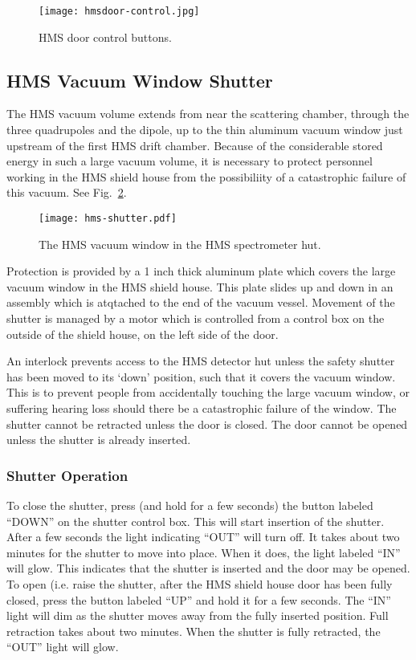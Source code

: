 {\begin{figure}
\begin{center}
\texttt{[image: hmsdoor-control.jpg]}
\caption{\label{fig:hmsdoorcontrol}HMS door control buttons.
}
\end{center}
\end{figure}

\subsection{HMS Vacuum Window Shutter}
The HMS vacuum volume extends from near the scattering chamber,
through the three quadrupoles and the dipole, up to the thin aluminum
vacuum window just upstream of the first HMS drift chamber. Because of
the considerable stored energy in such a large vacuum volume, it is
necessary to protect personnel working in the HMS shield house from
the possibiliity of a catastrophic failure of this vacuum.  See
Fig.~\ref{fig:hmsshutter}.

\begin{figure}
\texttt{[image: hms-shutter.pdf]}
\caption{\label{fig:hmsshutter}The HMS vacuum window in the HMS spectrometer hut.
}
\end{figure}

Protection is provided by a 1 inch thick aluminum plate which covers
the large vacuum window in the HMS shield house. This plate slides up
and down in an assembly which is atqtached to the end of the vacuum
vessel. Movement of the shutter is managed by a motor which is
controlled from a control box on the outside of the shield house, on
the left side of the door.

An interlock prevents access to the HMS detector hut unless the safety shutter has been moved to its `down' position, such that it covers the vacuum window. This is to prevent people from accidentally touching the large vacuum window, or suffering hearing loss should there be a catastrophic failure of the window. The shutter cannot be retracted unless the door is closed. The door cannot be opened unless the shutter is already inserted.

\subsubsection{Shutter Operation}

To close the shutter, press (and hold for a few seconds) the button
labeled ``DOWN'' on the shutter control box. This will start insertion
of the shutter. After a few seconds the light indicating ``OUT'' will
turn off. It takes about two minutes for the shutter to move into
place. When it does, the light labeled ``IN'' will glow. This
indicates that the shutter is inserted and the door may be opened.  To
open (i.e. raise the shutter, after the HMS shield house door has been
fully closed, press the button labeled ``UP'' and hold it for a few
seconds. The ``IN'' light will dim as the shutter moves away from the
fully inserted position. Full retraction takes about two minutes. When
the shutter is fully retracted, the ``OUT'' light will glow.

}
